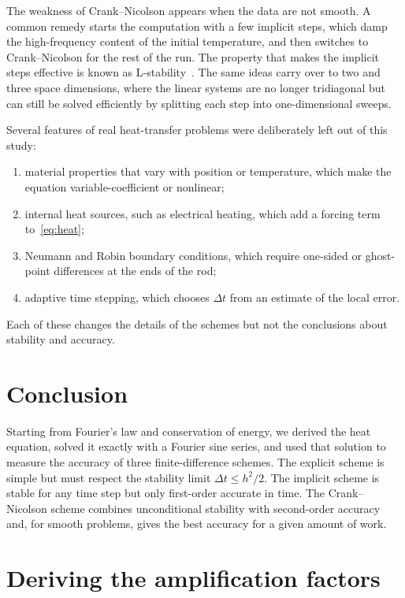 \documentclass[11pt]{article}
\theoremstyle{definition}
\theoremstyle{remark}
\begin{document}
The weakness of Crank--Nicolson appears when the data are not smooth. A common remedy starts the computation with a few implicit steps, which damp the high-frequency content of the initial temperature, and then switches to Crank--Nicolson for the rest of the run. The property that makes the implicit steps effective is known as L-stability~\cite{leveque2007}. The same ideas carry over to two and three space dimensions, where the linear systems are no longer tridiagonal but can still be solved efficiently by splitting each step into one-dimensional sweeps.

Several features of real heat-transfer problems were deliberately left out of this study:
\begin{enumerate}
  \item material properties that vary with position or temperature, which make the equation variable-coefficient or nonlinear;
  \item internal heat sources, such as electrical heating, which add a forcing term to~\eqref{eq:heat};
  \item Neumann and Robin boundary conditions, which require one-sided or ghost-point differences at the ends of the rod;
  \item adaptive time stepping, which chooses $\Delta t$ from an estimate of the local error.
\end{enumerate}
Each of these changes the details of the schemes but not the conclusions about stability and accuracy.

\section{Conclusion}\label{sec:conclusion}

Starting from Fourier's law and conservation of energy, we derived the heat equation, solved it exactly with a Fourier sine series, and used that solution to measure the accuracy of three finite-difference schemes. The explicit scheme is simple but must respect the stability limit $\Delta t \le h^2/2$. The implicit scheme is stable for any time step but only first-order accurate in time. The Crank--Nicolson scheme combines unconditional stability with second-order accuracy and, for smooth problems, gives the best accuracy for a given amount of work.

\appendix

\section{Deriving the amplification factors}\label{app:amplification}
\end{document}
